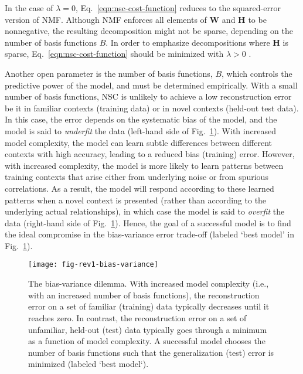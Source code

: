 In the case of $\lambda = 0$, Eq.~\ref{eqn:nsc-cost-function}
reduces to the squared-error version of \ac{NMF}.
Although \ac{NMF} enforces all elements of \textbf{W} and \textbf{H}
to be nonnegative,
the resulting decomposition might not be sparse,
depending on the number of basis functions $B$.
In order to emphasize decompositions where \textbf{H} is sparse,
Eq.~\ref{eqn:nsc-cost-function} should be minimized 
with $\lambda > 0$ \cite{Hoyer2002}.

Another open parameter is the number of basis functions, $B$, 
which controls the predictive power of the model,
and must be determined empirically.
With a small number of basis functions,
\ac{NSC} is unlikely to achieve a low reconstruction error
be it in familiar contexts (training data) or in novel contexts
(held-out test data).
In this case, the error depends on the systematic bias of the model,
and the model is said to \emph{underfit} the data
(left-hand side of Fig.~\ref{fig:nsc-bias-variance-dilemma}).
With increased model complexity,
the model can learn subtle differences 
between different contexts with high accuracy,
leading to a reduced bias (training) error.
However, with increased complexity, the model is more likely to learn
patterns between training contexts that arise either from underlying noise
or from spurious correlations. As a result,
the model will respond according to
these learned patterns when a novel context is presented
(rather than according to the underlying actual relationships), 
in which case the model is said to \emph{overfit} the data
(right-hand side of Fig.~\ref{fig:nsc-bias-variance-dilemma}).
Hence, the goal of a successful model is to find the ideal compromise
in the bias-variance error trade-off \cite{Beyeler2017}
(labeled `best model' in Fig.~\ref{fig:nsc-bias-variance-dilemma}).

\begin{figure}[h]
	\centering
	\texttt{[image: fig-rev1-bias-variance]}
    \caption{The bias-variance dilemma.
    With increased model complexity 
    (i.e., with an increased number of basis functions), 
    the reconstruction error on a set
    of familiar (training) data typically decreases until it reaches zero.
    In contrast, the reconstruction error on a set of unfamiliar, held-out
    (test) data typically goes through a minimum as a function of model complexity.
    A successful model chooses the number of basis functions such that the
    generalization (test) error is minimized (labeled `best model`).}
	\label{fig:nsc-bias-variance-dilemma}
\end{figure}

